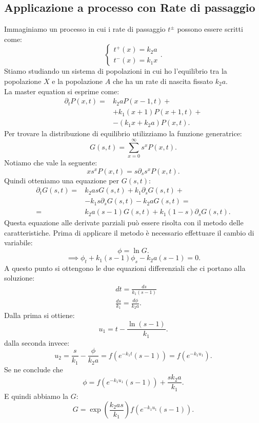\subsection{Applicazione a processo con Rate di passaggio}%
\label{sub:Applicazione a processo con Rate di passaggio}
Immaginiamo un processo in cui i rate di passaggio $t^{\pm}$ possono essere scritti come:
\[
    \begin{cases}
	t^+(x) = k_2a\\
	t^-(x) = k_1 x
    \end{cases}
.\] 
Stiamo studiando un sistema di popolazioni in cui ho l'equilibrio tra la popolazione $X$ e la popolazione $A$ che ha un rate di nascita fissato $k_2a$. \\
La master equation si esprime come:
\[\begin{aligned}
    \partial_{t}P(x,t) = & k_2aP(x-1, t) +\\
			 &+k_1(x+1) P(x+1,t) + \\
			 & - (k_1x+k_2a) P(x,t) 
.\end{aligned}\]
Per trovare la distribuzione di equilibrio utilizziamo la funzione generatrice:
\[
    G(s,t) = \sum_{x=0}^{\infty} s^{x}P(x,t) 
.\] 
Notiamo che vale la seguente:
\[
    xs^xP(x,t) = s\partial_{s}s^xP(x,t) 
.\] 
Quindi otteniamo una equazione per $G(s,t)$:
\[\begin{aligned}
    \partial_{t} G(s,t) =& k_2asG(s,t) + k_1\partial_{s}G(s,t) + \\
			 &- k_1s\partial_{s}G(s,t) - k_2aG(s,t) = \\
                        =& k_2a(s-1) G(s,t) + k_1(1-s) \partial_{s}G(s,t) 
.\end{aligned}\]
Questa equazione alle derivate parziali può essere risolta con il metodo delle caratteristiche. Prima di applicare il metodo è necessario effettuare il cambio di variabile:
\[
    \phi = \ln G
.\] 
\[
    \implies  \phi_t +k_1(s-1) \phi_s - k_2a(s-1) =0 
.\] 
A questo punto si ottengono le due equazioni differenziali che ci portano alla soluzione:
\[\begin{aligned}
    &dt = \frac{ds}{k_1(s-1)}\\
    & \frac{ds}{k_1} = \frac{d\phi}{k_2a}
.\end{aligned}\]
Dalla prima si ottiene:
\[
    u_1=t-\frac{\ln (s-1) }{k_1}
.\] 
dalla seconda invece:
\[
    u_2 = \frac{s}{k_1} - \frac{\phi}{k_2a} = f(e^{-k_1t}(s-1) ) = f(e^{-k_1u_1})
.\] 
Se ne conclude che 
\[
    \phi  = f(e^{-k_1u_1}(s-1)) + \frac{sk_2a}{k_1}
.\] 
E quindi abbiamo la $G$:
\[
    G = \exp\left(\frac{k_2as}{k_1}\right)f(e^{-k_1u_1}(s-1) ) 
.\] 
